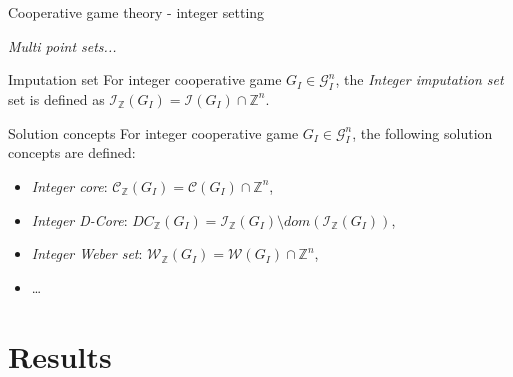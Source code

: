 \documentclass{beamer}
\newcommand{\Z}{\mathbb{Z}}
\begin{document}


\begin{frame}{Cooperative game theory - integer setting}

    \textit{Multi point sets...}


    \begin{block}{Imputation set}
        For integer cooperative game $G_I \in \mathcal{G}_I^n$, the \emph{Integer imputation set} set is defined as $\mathcal{I}_{\Z}(G_I) = \mathcal{I}(G_I) \cap \Z^{n}$.
    \end{block}


    \begin{block}{Solution concepts}
        For integer cooperative game $G_I \in \mathcal{G}_I^n$, the following solution concepts are defined:
        \begin{itemize}
            \item \emph{Integer core}: $\mathcal{C}_{\Z}(G_I) = \mathcal{C}(G_I) \cap \Z^{n}$,
            \item \emph{Integer D-Core}: $DC_{\Z}(G_I) = \mathcal{I}_{\Z}(G_I) \setminus dom(\mathcal{I}_{\Z}(G_I))$,
            \item \emph{Integer Weber set}: $\mathcal{W}_{\Z}(G_I) = \mathcal{W}(G_I) \cap \Z^{n}$,
            \item \dots
        \end{itemize}
    \end{block}


\end{frame}




\section{Results}

\end{document}

